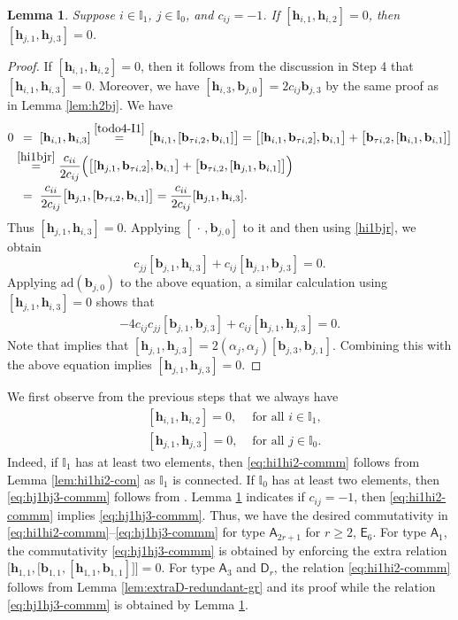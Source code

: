 \documentclass[11pt,reqno]{amsart}
\numberwithin{equation}{section}
\newtheorem{lem}[thm]{Lemma}
\theoremstyle{definition}
\theoremstyle{remark}
\newcommand{\bb}{\mathbf{b}}
\newcommand{\bh}{\mathbf{h}}
\newcommand{\gge}{\geqslant}
\newcommand{\I}{{\mathbb I}}
\begin{document}
\begin{lem}\label{lem:com-transit}
Suppose $i\in \I_1$, $j\in \I_0$, and $c_{ij}=-1$. If $[\bh_{i,1},\bh_{i,2}]=0$, then $[\bh_{j,1},\bh_{j,3}]=0$.
\end{lem}
\begin{proof}
If $[\bh_{i,1},\bh_{i,2}]=0$, then it follows from the discussion in Step 4 that $[\bh_{i,1},\bh_{i,3}]=0$. Moreover, we have $[\bh_{i,3},\bb_{j,0}]=2c_{ij}\bb_{j,3}$ by the same proof as in Lemma \ref{lem:h2bj}. We have
\begin{align*}
0&\,\,\,=\,\,[\bh_{i,1},\bh_{i,3}]\stackrel{\eqref{todo4-I1}}{=}\big[\bh_{i,1},[\bb_{\tau i,2},\bb_{i,1}]\big]=\big[[\bh_{i,1},\bb_{\tau i,2}],\bb_{i,1}\big]+\big[\bb_{\tau i,2},[\bh_{i,1},\bb_{i,1}]\big]\\
&\stackrel{\eqref{hi1bjr}}{=}\frac{c_{ii}}{2c_{ij}}\Big(\big[[\bh_{j,1},\bb_{\tau i,2}],\bb_{i,1}\big]+\big[\bb_{\tau i,2},[\bh_{j,1},\bb_{i,1}]\big]\Big)\\
&\,\,\,=\,\,\frac{c_{ii}}{2c_{ij}}\big[\bh_{j,1},[\bb_{\tau i,2},\bb_{i,1}]\big]=\frac{c_{ii}}{2c_{ij}}[\bh_{j,1},\bh_{i,3}].
\end{align*}
Thus $[\bh_{j,1},\bh_{i,3}]=0$. Applying $[\,\cdot\,,\bb_{j,0}]$ to it and then using \eqref{hi1bjr}, we obtain
\[
c_{jj}[\bb_{j,1},\bh_{i,3}]+c_{ij}[\bh_{j,1},\bb_{j,3}]=0.
\]
Applying $\mathrm{ad}(\bb_{j,0})$ to the above equation, a similar calculation using $[\bh_{j,1},\bh_{i,3}]=0$ shows that
\begin{align*}
-4c_{ij}c_{jj}[\bb_{j,1},\bb_{j,3}]+c_{ij}[\bh_{j,1},\bh_{j,3}]=0.
\end{align*}
Note that \cite[(3.35)]{Lu26min} implies that $[\bh_{j,1},\bh_{j,3}]=2(\alpha_j,\alpha_j)[\bb_{j,3},\bb_{j,1}]$. Combining this with the above equation implies $[\bh_{j,1},\bh_{j,3}]=0$.
\end{proof}

We first observe from the previous steps that we always have
\begin{align}
&[\bh_{i,1},\bh_{i,2}]=0, &\text{ for all }i\in \I_1,\label{eq:hi1hi2-commm}\\
&[\bh_{j,1},\bh_{j,3}]=0, &\text{ for all }j\in \I_0.\label{eq:hj1hj3-commm}
\end{align}
Indeed, 
if $\I_1$ has at least two elements, then \eqref{eq:hi1hi2-commm} follows from Lemma \ref{lem:hi1hi2-com} as $\I_1$ is connected. %
If $\I_0$ has at least two elements, then \eqref{eq:hj1hj3-commm} follows from \cite[Lemmas 3.9, 3.11]{Lu26min}. Lemma \ref{lem:com-transit} indicates if $c_{ij}=-1$, then \eqref{eq:hi1hi2-commm} implies \eqref{eq:hj1hj3-commm}. Thus, we have the desired commutativity in \eqref{eq:hi1hi2-commm}--\eqref{eq:hj1hj3-commm} for type $\mathsf A_{2r+1}$ for $r\gge 2$, $\mathsf E_6$. For type $\mathsf A_1$, the commutativity \eqref{eq:hj1hj3-commm} is obtained by enforcing the extra relation $\big[\bh_{1,1},\big[\bb_{1,1},[\bh_{1,1},\bb_{1,1}]\big]\big]=0$. For type $\mathsf A_3$ and $\mathsf D_r$, the relation \eqref{eq:hi1hi2-commm} follows from Lemma \ref{lem:extraD-redundant-gr} and its proof while the relation  \eqref{eq:hj1hj3-commm} is obtained by Lemma \ref{lem:com-transit}.
\end{document}

